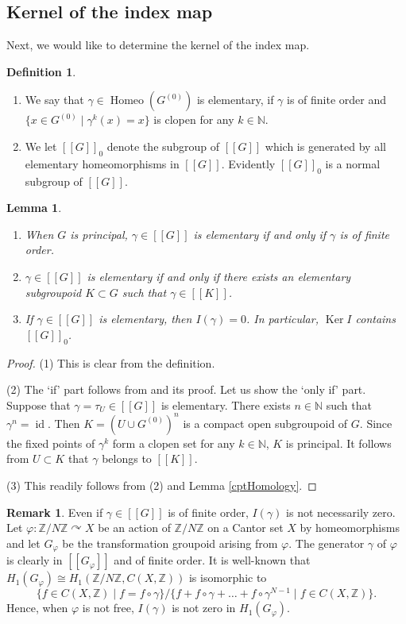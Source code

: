 \documentclass[11pt]{article}
\newtheorem{lem}[thm]{Lemma}
\theoremstyle{definition}
\newtheorem{df}[thm]{Definition}
\newtheorem{rem}[thm]{Remark}
\renewcommand{\phi}{\varphi}
\renewcommand{\ker}{\operatorname{Ker}}
\newcommand{\id}{\operatorname{id}}
\newcommand{\Homeo}{\operatorname{Homeo}}
\newcommand{\N}{\mathbb{N}}
\newcommand{\Z}{\mathbb{Z}}
\begin{document}
\subsection{Kernel of the index map}

Next, we would like to determine the kernel of the index map. 

\begin{df}
\begin{enumerate}
\item We say that $\gamma\in\Homeo(G^{(0)})$ is elementary, 
if $\gamma$ is of finite order and 
$\{x\in G^{(0)}\mid\gamma^k(x)=x\}$ is clopen for any $k\in\N$. 
\item We let $[[G]]_0$ denote the subgroup of $[[G]]$ 
which is generated by all elementary homeomorphisms in $[[G]]$. 
Evidently $[[G]]_0$ is a normal subgroup of $[[G]]$. 
\end{enumerate}
\end{df}

\begin{lem}\label{elementary}
\begin{enumerate}
\item When $G$ is principal, 
$\gamma\in[[G]]$ is elementary if and only if $\gamma$ is of finite order. 
\item $\gamma\in[[G]]$ is elementary if and only if 
there exists an elementary subgroupoid $K\subset G$ 
such that $\gamma\in[[K]]$. 
\item If $\gamma\in[[G]]$ is elementary, then $I(\gamma)=0$. 
In particular, $\ker I$ contains $[[G]]_0$. 
\end{enumerate}
\end{lem}
\begin{proof}
(1) This is clear from the definition. 

(2) The `if' part follows from 
\cite[Proposition 3.2]{Msrtfg} and its proof. 
Let us show the `only if' part. 
Suppose that $\gamma=\tau_U\in[[G]]$ is elementary. 
There exists $n\in\N$ such that $\gamma^n=\id$. 
Then $K=(U\cup G^{(0)})^n$ is a compact open subgroupoid of $G$. 
Since the fixed points of $\gamma^k$ form a clopen set for any $k\in\N$, 
$K$ is principal. 
It follows from $U\subset K$ that $\gamma$ belongs to $[[K]]$. 

(3) This readily follows from (2) and Lemma \ref{cptHomology}. 
\end{proof}

\begin{rem}
Even if $\gamma\in[[G]]$ is of finite order, 
$I(\gamma)$ is not necessarily zero. 
Let $\phi:\Z/N\Z\curvearrowright X$ be an action of $\Z/N\Z$ 
on a Cantor set $X$ by homeomorphisms and 
let $G_\phi$ be the transformation groupoid arising from $\phi$. 
The generator $\gamma$ of $\phi$ is clearly in $[[G_\phi]]$ and 
of finite order. 
It is well-known that 
$H_1(G_\phi)\cong H_1(\Z/N\Z,C(X,\Z))$ is isomorphic to 
\[
\{f\in C(X,\Z)\mid f=f\circ\gamma\}/
\{f+f\circ\gamma+\dots+f\circ\gamma^{N-1}\mid f\in C(X,\Z)\}. 
\]
Hence, when $\phi$ is not free, $I(\gamma)$ is not zero in $H_1(G_\phi)$. 
\end{rem}
\end{document}
